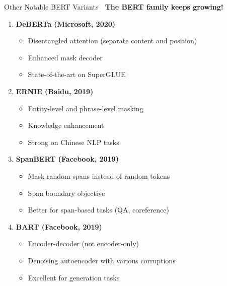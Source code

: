 \documentclass[aspectratio=169]{beamer}
\begin{document}
\begin{frame}[shrink=10]{Other Notable BERT Variants 🌟}
\textbf{The BERT family keeps growing!}

\vspace{1em}

\begin{enumerate}\setlength{\itemsep}{0pt}
    \item \textbf{DeBERTa (Microsoft, 2020)}
    \begin{itemize}\setlength{\itemsep}{0pt}
        \item Disentangled attention (separate content and position)
        \item Enhanced mask decoder
        \item State-of-the-art on SuperGLUE
    \end{itemize}

    \vspace{0.5em}

    \item \textbf{ERNIE (Baidu, 2019)}
    \begin{itemize}\setlength{\itemsep}{0pt}
        \item Entity-level and phrase-level masking
        \item Knowledge enhancement
        \item Strong on Chinese NLP tasks
    \end{itemize}

    \vspace{0.5em}

    \item \textbf{SpanBERT (Facebook, 2019)}
    \begin{itemize}\setlength{\itemsep}{0pt}
        \item Mask random spans instead of random tokens
        \item Span boundary objective
        \item Better for span-based tasks (QA, coreference)
    \end{itemize}

    \vspace{0.5em}

    \item \textbf{BART (Facebook, 2019)}
    \begin{itemize}\setlength{\itemsep}{0pt}
        \item Encoder-decoder (not encoder-only)
        \item Denoising autoencoder with various corruptions
        \item Excellent for generation tasks
    \end{itemize}
\end{enumerate}
\end{frame}
\end{document}
